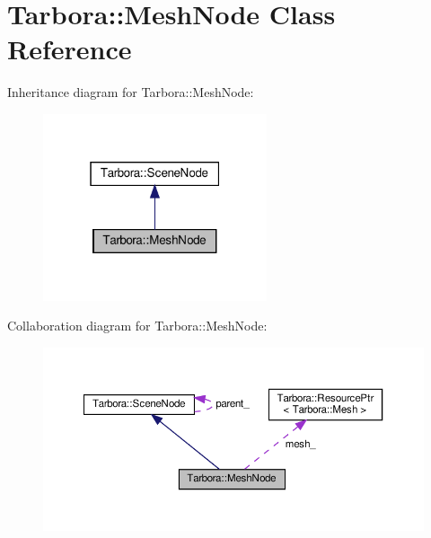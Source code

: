 \hypertarget{classTarbora_1_1MeshNode}{}\section{Tarbora\+:\+:Mesh\+Node Class Reference}
\label{classTarbora_1_1MeshNode}


Inheritance diagram for Tarbora\+:\+:Mesh\+Node\+:
\nopagebreak
\begin{figure}[H]
\begin{center}
\leavevmode
\includegraphics[width=187pt]{classTarbora_1_1MeshNode__inherit__graph}
\end{center}
\end{figure}


Collaboration diagram for Tarbora\+:\+:Mesh\+Node\+:
\nopagebreak
\begin{figure}[H]
\begin{center}
\leavevmode
\includegraphics[width=350pt]{classTarbora_1_1MeshNode__coll__graph}
\end{center}
\end{figure}
